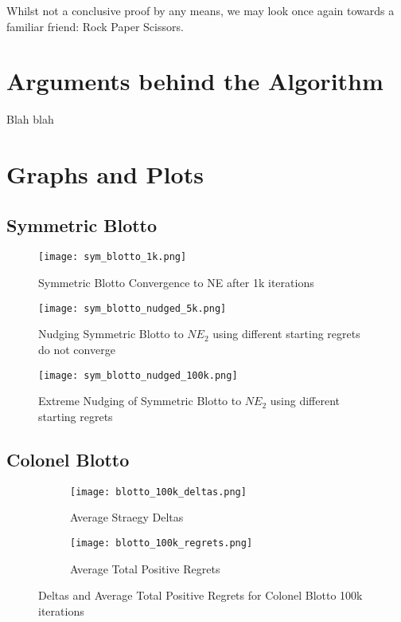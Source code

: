 \documentclass [11pt]{article}
\begin{document}
Whilst not a conclusive proof by any means, we may look once again towards a familiar friend: Rock Paper Scissors.


\pagebreak
\section{Arguments behind the Algorithm} \label{algo-theory}

Blah blah

\pagebreak
\appendix
\appendixpage

\section{Graphs and Plots}

\subsection{Symmetric Blotto}

\begin{figure}[H]
  \centering
  \texttt{[image: sym\_blotto\_1k.png]}
  \caption{Symmetric Blotto Convergence to NE after 1k iterations}
  \label{fig:sym-blotto}
\end{figure}

\begin{figure}[H]
  \centering
  \texttt{[image: sym\_blotto\_nudged\_5k.png]}
  \caption{Nudging Symmetric Blotto to $NE_2$ using different starting regrets do not converge}
  \label{fig:sym-nudge-plots}
\end{figure}

\begin{figure}[H]
  \centering
  \texttt{[image: sym\_blotto\_nudged\_100k.png]}
  \caption{Extreme Nudging of Symmetric Blotto to $NE_2$ using different starting regrets}
  \label{fig:sym-nudge-extreme-plots}
\end{figure}

\subsection{Colonel Blotto}


\begin{figure}[H]
  \centering
  \begin{subfigure}[b]{0.45\textwidth}
    \centering
    \texttt{[image: blotto\_100k\_deltas.png]}
    \caption{Average Straegy Deltas}
  \end{subfigure}
  \begin{subfigure}[b]{0.45\textwidth}
    \centering
    \texttt{[image: blotto\_100k\_regrets.png]}
    \caption{Average Total Positive Regrets}
  \end{subfigure}

  \caption{Deltas and Average Total Positive Regrets for Colonel Blotto 100k iterations}
\end{figure}
\end{document}
